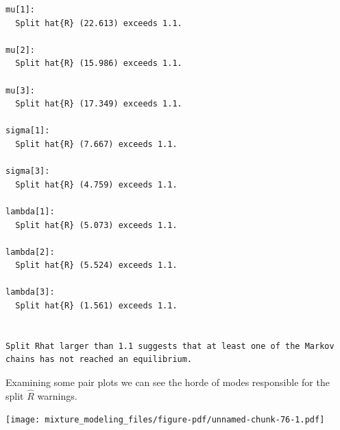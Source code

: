 \documentclass[
  letterpaper,
  DIV=11,
  numbers=noendperiod]{scrartcl}
\newenvironment{Shaded}{\begin{snugshade}}{\end{snugshade}}
\newcommand{\ControlFlowTok}[1]{\textcolor[rgb]{0.00,0.23,0.31}{#1}}
\newcommand{\DecValTok}[1]{\textcolor[rgb]{0.68,0.00,0.00}{#1}}
\newcommand{\FunctionTok}[1]{\textcolor[rgb]{0.28,0.35,0.67}{#1}}
\newcommand{\NormalTok}[1]{\textcolor[rgb]{0.00,0.23,0.31}{#1}}
\newcommand{\OtherTok}[1]{\textcolor[rgb]{0.00,0.23,0.31}{#1}}
\newcommand{\SpecialCharTok}[1]{\textcolor[rgb]{0.37,0.37,0.37}{#1}}
\newcommand{\StringTok}[1]{\textcolor[rgb]{0.13,0.47,0.30}{#1}}
\begin{document}
\begin{verbatim}
mu[1]:
  Split hat{R} (22.613) exceeds 1.1.

mu[2]:
  Split hat{R} (15.986) exceeds 1.1.

mu[3]:
  Split hat{R} (17.349) exceeds 1.1.

sigma[1]:
  Split hat{R} (7.667) exceeds 1.1.

sigma[3]:
  Split hat{R} (4.759) exceeds 1.1.

lambda[1]:
  Split hat{R} (5.073) exceeds 1.1.

lambda[2]:
  Split hat{R} (5.524) exceeds 1.1.

lambda[3]:
  Split hat{R} (1.561) exceeds 1.1.


Split Rhat larger than 1.1 suggests that at least one of the Markov
chains has not reached an equilibrium.
\end{verbatim}

Examining some pair plots we can see the horde of modes responsible for
the split \(\hat{R}\) warnings.

\begin{Shaded}
\end{Shaded}

\texttt{[image: mixture\_modeling\_files/figure-pdf/unnamed-chunk-76-1.pdf]}

\begin{Shaded}
\end{Shaded}
\end{document}
